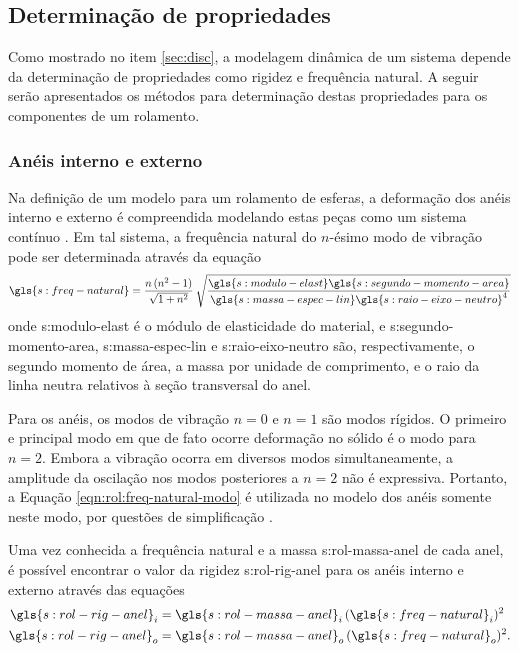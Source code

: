 \documentclass[12pt,oneside,english,brazil,lmodern,siglas,simbolos,cite=num]{ucsmonograph}
\begin{document}
	\subsection{Determinação de propriedades}
	Como mostrado no item \ref{sec:disc}, a modelagem dinâmica de um sistema depende da determinação de propriedades como rigidez e frequência natural.
	A seguir serão apresentados os métodos para determinação destas propriedades para os componentes de um rolamento.
	
	\subsubsection{Anéis interno e externo} \label{sec:props-aneis}
	Na definição de um modelo para um rolamento de esferas, a deformação dos anéis interno e externo é compreendida modelando estas peças como um sistema contínuo \cite{sassi:2007}.
	Em tal sistema, a frequência natural do $n$-ésimo modo de vibração pode ser determinada através da equação \cite{tandon:1997,sassi:2007,cong:2013}
	\begin{equation} \label{eqn:rol:freq-natural-modo}
		\gls{s:freq-natural} = \frac{n\,(n^2-1)}{\sqrt{1+n^2}}\:
		\sqrt{\frac{\gls{s:modulo-elast}\gls{s:segundo-momento-area}}{
		\gls{s:massa-espec-lin}\gls{s:raio-eixo-neutro}^4}}
	\end{equation}
	onde \gls{s:modulo-elast} é o módulo de elasticidade do material, e \gls{s:segundo-momento-area}, \gls{s:massa-espec-lin} e \gls{s:raio-eixo-neutro} são, respectivamente, o segundo momento de área, a massa por unidade de comprimento, e o raio da linha neutra relativos à seção transversal do anel.
	
	Para os anéis, os modos de vibração $n=0$ e $n=1$ são modos rígidos.
	O primeiro e principal modo em que de fato ocorre deformação no sólido é o modo para $n=2$.
	Embora a vibração ocorra em diversos modos simultaneamente, a amplitude da oscilação nos modos posteriores a $n=2$ não é expressiva.
	Portanto, a Equação \ref{eqn:rol:freq-natural-modo} é utilizada no modelo dos anéis somente neste modo, por questões de simplificação \cite{sassi:2007}.
	
	Uma vez conhecida a frequência natural e a massa \gls{s:rol-massa-anel} de cada anel, é possível encontrar o valor da rigidez \gls{s:rol-rig-anel} para os anéis interno e externo através das equações \cite{sassi:2007}
	\begin{align}
		\gls{s:rol-rig-anel}_i &= \gls{s:rol-massa-anel}_i\,
			(\gls{s:freq-natural}_i)^2 \label{eqn:rol:rig-anel-int}\\
		\gls{s:rol-rig-anel}_o &= \gls{s:rol-massa-anel}_o\,
			(\gls{s:freq-natural}_o)^2 \label{eqn:rol:rig-anel-ext}.
	\end{align}
	
\end{document}
